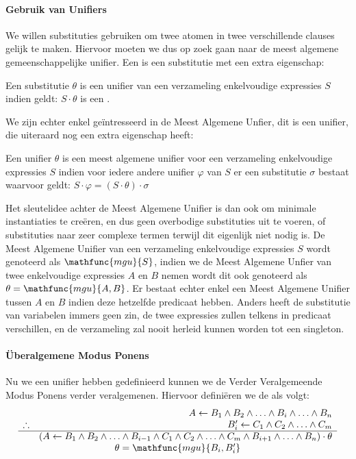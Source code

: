 \paragraph{Gebruik van Unifiers}
We willen substituties gebruiken om twee atomen in twee verschillende clauses gelijk te maken. Hiervoor moeten we dus op zoek gaan naar de meest algemene gemeenschappelijke unifier. Een  is een substitutie met een extra eigenschap:
\begin{theorem}
Een substitutie $\theta$ is een unifier van een verzameling enkelvoudige expressies $S$ indien geldt: $S\cdot\theta$ is een .
\end{theorem}
We zijn echter enkel geïntresseerd in de Meest Algemene Unfier, dit is een unifier, die uiteraard nog een extra eigenschap heeft:
\begin{theorem}
Een unifier $\theta$ is een meest algemene unifier voor een verzameling enkelvoudige expressies $S$ indien voor iedere andere unifier $\varphi$ van $S$ er een substitutie $\sigma$ bestaat waarvoor geldt: $S\cdot\varphi=\left(S\cdot\theta\right)\cdot\sigma$
\end{theorem}
Het sleutelidee achter de Meest Algemene Unifier is dan ook om minimale instantiaties te creëren, en dus geen overbodige substituties uit te voeren, of substituties naar zeer complexe termen terwijl dit eigenlijk niet nodig is. De Meest Algemene Unifier van een verzameling enkelvoudige expressies $S$ wordt genoteerd als $\mathfunc{mgu}{S}$, indien we de Meest Algemene Unfier van twee enkelvoudige expressies $A$ en $B$ nemen wordt dit ook genoteerd als $\theta=\mathfunc{mgu}{A,B}$. Er bestaat echter enkel een Meest Algemene Unifier tussen $A$ en $B$ indien deze hetzelfde predicaat hebben. Anders heeft de substitutie van variabelen immers geen zin, de twee expressies zullen telkens in predicaat verschillen, en de verzameling zal nooit herleid kunnen worden tot een singleton.
\paragraph{Überalgemene Modus Ponens}
Nu we een unifier hebben gedefinieerd kunnen we de Verder Veralgemeende Modus Ponens verder veralgemenen. Hiervoor definiëren we de  als volgt:
\begin{equation}
\begin{array}{lr}
&A\leftarrow B_1\wedge B_2\wedge\ldots\wedge B_i\wedge\ldots\wedge B_n\\
\therefore&B_i'\leftarrow C_1\wedge C_2\wedge\ldots\wedge C_m\\
\hline
&\left(A\leftarrow B_1\wedge B_2\wedge\ldots\wedge B_{i-1}\wedge C_1\wedge C_2\wedge\ldots\wedge C_m\wedge B_{i+1}\wedge\ldots\wedge B_n\right)\cdot\theta\\
\multicolumn{2}{c}{\theta=\mathfunc{mgu}{B_i,B_i'}}
\end{array}
\end{equation}

